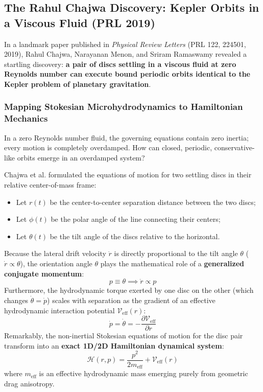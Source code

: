 \documentclass[11pt,a4paper]{article}
\begin{document}
\subsection{The Rahul Chajwa Discovery: Kepler Orbits in a Viscous Fluid (PRL 2019)}
In a landmark paper published in \emph{Physical Review Letters} (PRL 122, 224501, 2019), Rahul Chajwa, Narayanan Menon, and Sriram Ramaswamy revealed a startling discovery: \textbf{a pair of discs settling in a viscous fluid at zero Reynolds number can execute bound periodic orbits identical to the Kepler problem of planetary gravitation}.

\subsubsection{Mapping Stokesian Microhydrodynamics to Hamiltonian Mechanics}
In a zero Reynolds number fluid, the governing equations contain zero inertia; every motion is completely overdamped. How can closed, periodic, conservative-like orbits emerge in an overdamped system?

Chajwa et al. formulated the equations of motion for two settling discs in their relative center-of-mass frame:
\begin{itemize}
    \item Let $r(t)$ be the center-to-center separation distance between the two discs;
    \item Let $\phi(t)$ be the polar angle of the line connecting their centers;
    \item Let $\theta(t)$ be the tilt angle of the discs relative to the horizontal.
\end{itemize}
Because the lateral drift velocity $\dot{r}$ is directly proportional to the tilt angle $\theta$ ($\dot{r} \propto \theta$), the orientation angle $\theta$ plays the mathematical role of a \textbf{generalized conjugate momentum}:
\begin{equation}
    p \equiv \theta \implies \dot{r} \propto p
\end{equation}
Furthermore, the hydrodynamic torque exerted by one disc on the other (which changes $\dot{\theta} = \dot{p}$) scales with separation as the gradient of an effective hydrodynamic interaction potential $\mathcal{V}_{\text{eff}}(r)$:
\begin{equation}
    \dot{p} = \dot{\theta} = -\frac{\partial \mathcal{V}_{\text{eff}}}{\partial r}
\end{equation}
Remarkably, the non-inertial Stokesian equations of motion for the disc pair transform into an \textbf{exact 1D/2D Hamiltonian dynamical system}:
\begin{equation}
    \boxed{ \mathcal{H}(r, p) = \frac{p^2}{2 m_{\text{eff}}} + \mathcal{V}_{\text{eff}}(r) } \label{eq:chajwa_hamiltonian}
\end{equation}
where $m_{\text{eff}}$ is an effective hydrodynamic mass emerging purely from geometric drag anisotropy.
\end{document}
